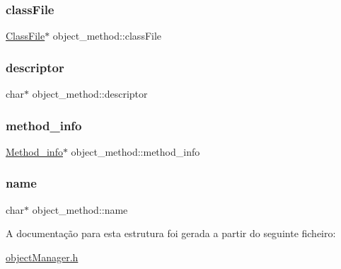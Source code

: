 \subsubsection{\texorpdfstring{class\+File}{classFile}}
{\footnotesize\ttfamily \hyperlink{struct_class_file}{Class\+File}$\ast$ object\+\_\+method\+::class\+File}

\mbox{\label{structobject__method_a80a6504d57919c614fa2e30d73df4449}} 
\subsubsection{\texorpdfstring{descriptor}{descriptor}}
{\footnotesize\ttfamily char$\ast$ object\+\_\+method\+::descriptor}

\mbox{\label{structobject__method_a1d3a60721432806f7179aa991e188a17}} 
\subsubsection{\texorpdfstring{method\+\_\+info}{method\_info}}
{\footnotesize\ttfamily \hyperlink{struct_method__info}{Method\+\_\+info}$\ast$ object\+\_\+method\+::method\+\_\+info}

\mbox{\label{structobject__method_acf958be3e2938f93baa1215620f42348}} 
\subsubsection{\texorpdfstring{name}{name}}
{\footnotesize\ttfamily char$\ast$ object\+\_\+method\+::name}



A documentação para esta estrutura foi gerada a partir do seguinte ficheiro\+:\begin{DoxyCompactItemize}
\item 
\hyperlink{object_manager_8h}{object\+Manager.\+h}\end{DoxyCompactItemize}
